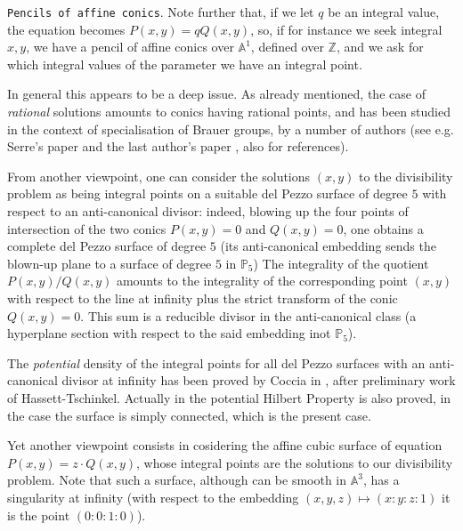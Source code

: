 \documentclass[leqno,12pt]{article} %
\def\A{{{\mathbb A}}}
\def\Z{{{\mathbb Z}}}
\def\P{{{\mathbb P}}}
\theoremstyle{plain} %
\theoremstyle{definition} %
\begin{document}
\smallskip

{\tt Pencils of affine conics}. Note further that, if we let $q$ be an integral value, the equation becomes 
$P(x,y)=qQ(x,y)$, so,  if for instance we seek integral  $x,y$, we have a pencil of  affine conics over $\A^1$, defined over $\Z$, and we ask for which integral values of the parameter we have an integral point. 

\smallskip

In general this appears to be a deep issue. As already mentioned, the case of {\it rational} solutions amounts to conics having rational points, and has been studied in the context of specialisation of Brauer groups, by a number of authors (see e.g. Serre's paper \cite{S2} and  the last author's  paper \cite{ZEns}, also for references).  

\smallskip

From another viewpoint, one can consider the solutions $(x,y)$ to the divisibility problem as being integral points on a suitable del Pezzo surface of degree $5$ with respect to an anti-canonical divisor: indeed, blowing up the four points of intersection of the two conics $P(x,y)=0$ and $Q(x,y)=0$, one obtains a complete del Pezzo surface of degree $5$ (its anti-canonical embedding sends the blown-up plane to a surface of degree $5$ in $\P_5$) The integrality of the quotient $P(x,y)/Q(x,y)$ amounts to the integrality of the corresponding point $(x,y)$ with respect to the line at infinity plus the strict transform of the conic $Q(x,y)=0$. This sum is a reducible divisor in the anti-canonical class (a hyperplane section with respect to the said embedding inot $\P_5$).

The {\it potential} density of the integral points for all del Pezzo surfaces with an anti-canonical divisor at infinity has been proved by Coccia in \cite{Coccia2}, after preliminary work of Hassett-Tschinkel. Actually in \cite{Coccia2} the potential Hilbert Property is also proved, in the case the surface is simply connected, which is the present case.

\smallskip

Yet another viewpoint consists in cosidering the affine cubic surface of equation $ P(x,y)=z\cdot Q(x,y)$, whose integral points are the solutions to our divisibility problem. Note that such a surface, although can be smooth in $\A^3$, has a singularity at infinity (with respect to the embedding $(x,y,z)\mapsto (x:y:z:1)$ it is the point $(0:0:1:0)$). 
\end{document}
